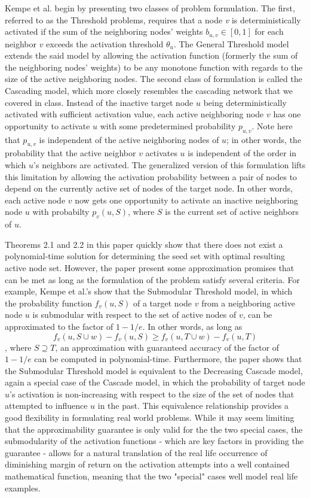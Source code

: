 \documentclass{article}
\begin{document}
Kempe et al. begin by presenting two classes of problem formulation. The first, referred to as the Threshold problems, requires that a node \textit{v} is deterministically activated if the sum of the neighboring nodes' weights $b_{u,v}\in[0, 1]$ for each neighbor $v$ exceeds the activation threshold $\theta_u$. The General Threshold model extends the said model by allowing the activation function (formerly the sum of the neighboring nodes' weights) to be any monotone function with regards to the size of the active neighboring nodes. The second class of formulation is called the Cascading model, which more closely resembles the cascading network that we covered in class. Instead of the inactive target node $u$ being deterministically activated with sufficient activation value, each active neighboring node $v$ has one opportunity to activate $u$ with some predetermined probability $p_{u, v}$. Note here that $p_{u, v}$ is independent of the active neighboring nodes of $u$; in other words, the probability that the active neighbor $v$ activates $u$ is independent of the order in which $u$'s neighbors are activated. The generalized version of this formulation lifts this limitation by allowing the activation probability between a pair of nodes to depend on the currently active set of nodes of the target node. In other words, each active node $v$ now gets one opportunity to activate an inactive neighboring node $u$ with probabilty $p_v(u, S)$, where $S$ is the current set of active neighbors of $u$.

Theorems 2.1 and 2.2 in this paper quickly show that there does not exist a polynomial-time solution for determining the seed set with optimal resulting active node set. However, the paper present some approximation promises that can be met as long as the formulation of the problem satisfy several criteria. For example, Kempe et al.'s show that the Submodular Threshold model, in which the probability function $f_v(u, S)$ of a target node $v$ from a neighboring active node $u$ is submodular with respect to the set of active nodes of $v$, can be approximated to the factor of $1-1/e$. In other words, as long as $$f_v(u, S\cup{w}) - f_v(u, S) \geq f_v(u, T\cup{w}) - f_v(u, T)$$, where $S \supseteq T$, an approximation with guaranteed accuracy of the factor of $1-1/e$ can be computed in polynomial-time. Furthermore, the paper shows that the Submodular Threshold model is equivalent to the Decreasing Cascade model, again a special case of the Cascade model, in which the probability of target node $u$'s activation is non-increasing with respect to the size of the set of nodes that attempted to influence $u$ in the past. This equivalence relationship provides a good flexibility in formulating real world problems. While it may seem limiting that the approximability guarantee is only valid for the the two special cases, the submodularity of the activation functions - which are key factors in providing the guarantee - allows for a natural translation of the real life occurrence of diminishing margin of return on the activation attempts into a well contained mathematical function, meaning that the two "special" cases well model real life examples.
\end{document}
